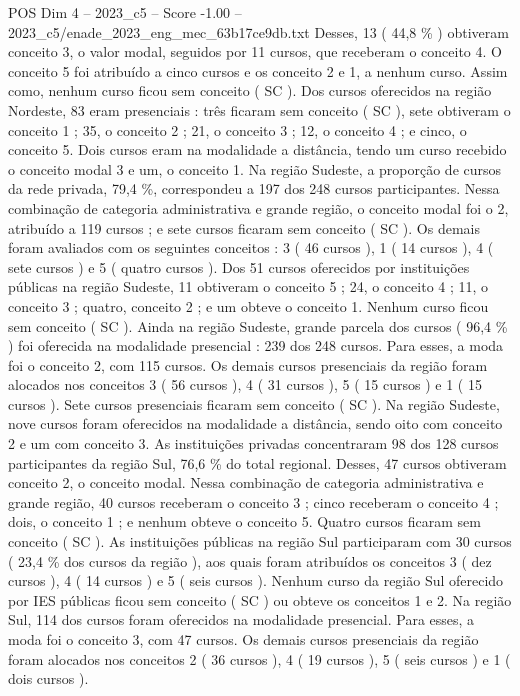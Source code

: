\begin{textsample}{POS Dim 4 – 2023\_c5 – Score -1.00 – 2023\_c5/enade\_2023\_eng\_mec\_63b17ce9db.txt}
Desses, 13 ( 44,8 \% ) obtiveram conceito 3, o valor modal, seguidos por 11 cursos, que receberam o conceito 4.
O conceito 5 foi atribuído a cinco cursos e os conceito 2 e 1, a nenhum curso.
Assim como, nenhum curso ficou sem conceito ( SC ).
Dos cursos oferecidos na região Nordeste, 83 eram presenciais : três ficaram sem conceito ( SC ), sete obtiveram o conceito 1 ; 35, o conceito 2 ; 21, o conceito 3 ; 12, o conceito 4 ; e cinco, o conceito 5.
Dois cursos eram na modalidade a distância, tendo um curso recebido o conceito modal 3 e um, o conceito 1.
Na região Sudeste, a proporção de cursos da rede privada, 79,4 \%, correspondeu a 197 dos 248 cursos participantes.
Nessa combinação de categoria administrativa e grande região, o conceito modal foi o 2, atribuído a 119 cursos ; e sete cursos ficaram sem conceito ( SC ).
Os demais foram avaliados com os seguintes conceitos : 3 ( 46 cursos ), 1 ( 14 cursos ), 4 ( sete cursos ) e 5 ( quatro cursos ).
Dos 51 cursos oferecidos por instituições públicas na região Sudeste, 11 obtiveram o conceito 5 ; 24, o conceito 4 ; 11, o conceito 3 ; quatro, conceito 2 ; e um obteve o conceito 1.
Nenhum curso ficou sem conceito ( SC ).
Ainda na região Sudeste, grande parcela dos cursos ( 96,4 \% ) foi oferecida na modalidade presencial : 239 dos 248 cursos.
Para esses, a moda foi o conceito 2, com 115 cursos.
Os demais cursos presenciais da região foram alocados nos conceitos 3 ( 56 cursos ), 4 ( 31 cursos ), 5 ( 15 cursos ) e 1 ( 15 cursos ).
Sete cursos presenciais ficaram sem conceito ( SC ).
Na região Sudeste, nove cursos foram oferecidos na modalidade a distância, sendo oito com conceito 2 e um com conceito 3.
As instituições privadas concentraram 98 dos 128 cursos participantes da região Sul, 76,6 \% do total regional.
Desses, 47 cursos obtiveram conceito 2, o conceito modal.
Nessa combinação de categoria administrativa e grande região, 40 cursos receberam o conceito 3 ; cinco receberam o conceito 4 ; dois, o conceito 1 ; e nenhum obteve o conceito 5.
Quatro cursos ficaram sem conceito ( SC ).
As instituições públicas na região Sul participaram com 30 cursos ( 23,4 \% dos cursos da região ), aos quais foram atribuídos os conceitos 3 ( dez cursos ), 4 ( 14 cursos ) e 5 ( seis cursos ).
Nenhum curso da região Sul oferecido por IES públicas ficou sem conceito ( SC ) ou obteve os conceitos 1 e 2.
Na região Sul, 114 dos cursos foram oferecidos na modalidade presencial.
Para esses, a moda foi o conceito 3, com 47 cursos.
Os demais cursos presenciais da região foram alocados nos conceitos 2 ( 36 cursos ), 4 ( 19 cursos ), 5 ( seis cursos ) e 1 ( dois cursos ).

\end{textsample}
